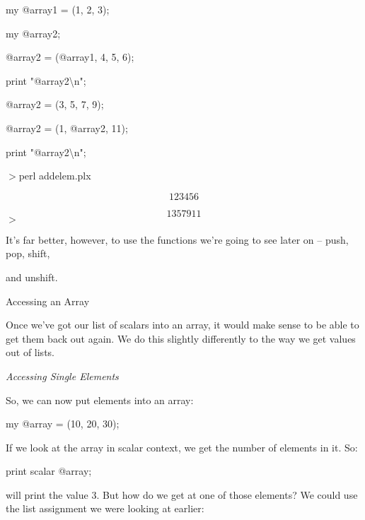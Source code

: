 \documentclass[a4paper,11pt]{book}
\begin{document}
\noindent 

\noindent my @array1 = (1, 2, 3);

\noindent my @array2;

\noindent @array2 = (@array1, 4, 5, 6);

\noindent print "@array2\textbackslash n";

\noindent 

\noindent @array2 = (3, 5, 7, 9);

\noindent @array2 = (1, @array2, 11);

\noindent print "@array2\textbackslash n";

\noindent 

\noindent $>$perl addelem.plx

\[1 2 3 4 5 6 \] 

\[1 3 5 7 9 11\] 
$>$

\noindent 

\noindent 

\noindent It's far better,  however,  to  use  the  functions  we're  going  to  see  later  on  --  push,  pop,  shift,

\noindent and unshift.

\noindent 

\noindent Accessing an Array

\noindent 

\noindent Once we've got our list of scalars into an array, it would make sense to be able to get them back out again. We do this slightly differently to the way we get values out of lists.

\noindent 

\noindent \textit{Accessing Single Elements}

\noindent So, we can now put elements into an array:

\noindent 

\noindent 

\noindent my @array = (10, 20, 30);

\noindent 

\noindent If we look at the array in scalar context, we get the number of elements in it. So:

\noindent 

\noindent 

\noindent print scalar @array;

\noindent 

\noindent will print the value 3. But how do we get at one of those elements? We could use the list assignment we were looking at earlier:
\end{document}
